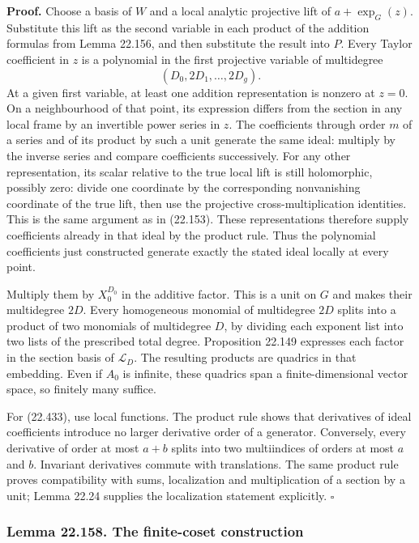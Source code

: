 \documentclass[
  11pt,
  a4paper,
]{article}
\begin{document}
\textbf{Proof.} Choose a basis of \(W\) and a local analytic projective
lift of \(a+\exp_G(z)\). Substitute this lift as the second variable in
each product of the addition formulas from Lemma 22.156, and then
substitute the result into \(P\). Every Taylor coefficient in \(z\) is a
polynomial in the first projective variable of multidegree \[
 (D_0,2D_1,\ldots,2D_g).
 \tag{22.434}
\] At a given first variable, at least one addition representation is
nonzero at \(z=0\). On a neighbourhood of that point, its expression
differs from the section in any local frame by an invertible power
series in \(z\). The coefficients through order \(m\) of a series and of
its product by such a unit generate the same ideal: multiply by the
inverse series and compare coefficients successively. For any other
representation, its scalar relative to the true local lift is still
holomorphic, possibly zero: divide one coordinate by the corresponding
nonvanishing coordinate of the true lift, then use the projective
cross-multiplication identities. This is the same argument as in
(22.153). These representations therefore supply coefficients already in
that ideal by the product rule. Thus the polynomial coefficients just
constructed generate exactly the stated ideal locally at every point.

Multiply them by \(X_0^{D_0}\) in the additive factor. This is a unit on
\(G\) and makes their multidegree \(2D\). Every homogeneous monomial of
multidegree \(2D\) splits into a product of two monomials of multidegree
\(D\), by dividing each exponent list into two lists of the prescribed
total degree. Proposition 22.149 expresses each factor in the section
basis of \(\mathcal L_D\). The resulting products are quadrics in that
embedding. Even if \(A_0\) is infinite, these quadrics span a
finite-dimensional vector space, so finitely many suffice.

For (22.433), use local functions. The product rule shows that
derivatives of ideal coefficients introduce no larger derivative order
of a generator. Conversely, every derivative of order at most \(a+b\)
splits into two multiindices of orders at most \(a\) and \(b\).
Invariant derivatives commute with translations. The same product rule
proves compatibility with sums, localization and multiplication of a
section by a unit; Lemma 22.24 supplies the localization statement
explicitly. \(\square\)

\subsubsection{Lemma 22.158. The finite-coset
construction}\label{lemma-22.158.-the-finite-coset-construction}
\end{document}
